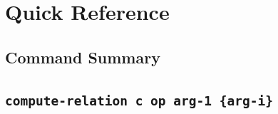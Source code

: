 \documentclass[headsepline]{scrreprt}
\theoremstyle{definition}
\newlength{\kastenbreite}
\newcommand{\kasten}[1]{\begin{minipage}
{.5\linewidth}
\setlength{\fboxrule}{0.4mm} \hspace{0.5cm}
\shadowbox{\parbox{\kastenbreite}{{\small #1}}}
\vspace{1mm}
\end{minipage}}
\begin{document}


\chapter{Quick Reference}

\section{Command Summary}
\section*{\tt compute-relation c op arg-1 \{arg-i\}}
\end{document}
